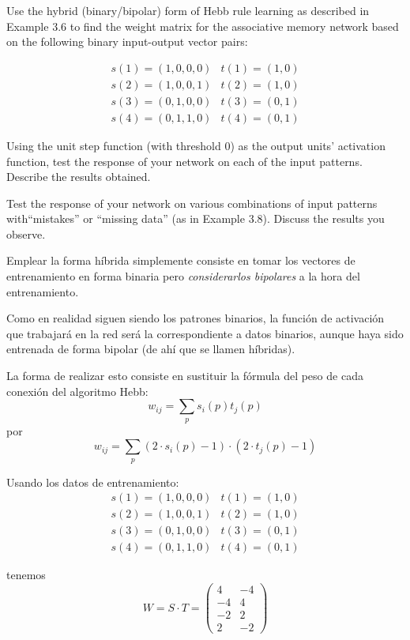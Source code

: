 \begin{problem}[6]
\ppart Use the hybrid (binary/bipolar) form of Hebb rule learning as described in Example
3.6 to find the weight matrix for the associative memory network based on the
following binary input-output vector pairs:

\[\begin{array}{cc}
s(1) = (1,0,0,0) & t(1)=(1,0)\\
s(2) = (1,0,0,1) & t(2) = (1,0)\\
s(3)=(0,1,0,0) & t(3) = (0,1) \\
s(4) = (0,1,1,0) & t(4) = (0,1)
\end{array}\]

\ppart  Using the unit step function (with threshold 0) as the output units' activation function, test the response of your network on each of the input patterns. Describe the results obtained.

\ppart Test the response of your network on various combinations of input patterns with``mistakes'' or ``missing data'' (as in Example 3.8). Discuss the results you observe.

\solution


\spart

Emplear la forma híbrida simplemente consiste en tomar los vectores de entrenamiento en forma binaria pero \emph{considerarlos bipolares} a la hora del entrenamiento.

Como en realidad siguen siendo los patrones binarios, la función de activación que trabajará en la red será la correspondiente a datos binarios, aunque haya sido entrenada de forma bipolar (de ahí que se llamen híbridas).

La forma de realizar esto consiste en sustituir la fórmula del peso de cada conexión del algoritmo Hebb:
\[w_{ij} = \sum_p s_i(p)t_j(p)\]
por
\[w_{ij} = \sum_p (2\cdot s_i(p)-1) \cdot (2\cdot t_j(p)-1)\]

Usando los datos de entrenamiento:
\[\begin{array}{cc}
s(1) = (1,0,0,0) & t(1) = (1,0)\\
s(2) = (1,0,0,1) & t(2) = (1,0)\\
s(3)=  (0,1,0,0) & t(3) = (0,1) \\
s(4) = (0,1,1,0) & t(4) = (0,1)
\end{array}\]

tenemos
\[W = S\cdot T = \left( \begin{array}{cc}
4 & -4 \\
-4 & 4 \\
-2 & 2 \\
2 & -2
\end{array}\right)\]


\end{problem}
